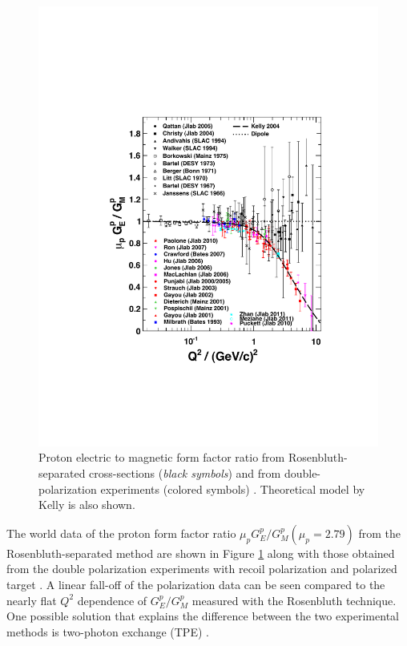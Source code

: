 \documentclass[12pt]{article}
\begin{document}
\begin{figure}[htbp]
\centering
\mbox{\includegraphics[scale=0.5]{gepgmp}}
\caption{Proton electric to magnetic form factor ratio from Rosenbluth-separated cross-sections (\emph{black symbols}) \cite{26, 27, 28, 29, 30, 31, 32, 33, 34, 35} and from double-polarization experiments (colored symbols) \cite{43, 44, 45, 46, 47, 48, 49, 50, 51, 52, 53, 54, 55, 56, 57, 58, 59, 60}. Theoretical model by Kelly \cite{99} is also shown.}
\label{fig1}
\end{figure}

The world data of the proton form factor ratio $\mu_pG^p_E/G^p_M (\mu_p=2.79)$ from the Rosenbluth-separated method \cite{26, 27, 28, 29, 30, 31, 32, 33, 34, 35}  are shown in Figure \ref{fig1} along with those obtained from the double polarization experiments with recoil polarization  \cite{43, 44, 45, 46, 47, 48, 49, 50, 51, 52, 53, 54, 55, 56, 57, 58} and polarized target \cite{59,60}. A linear fall-off of the polarization data can be seen compared to the nearly flat $Q^2$ dependence of $G_E^p/G_M^p$ measured with the Rosenbluth technique. One possible solution that explains the difference between the two experimental methods is two-photon exchange (TPE) \cite{89, 90, 91, 92, 93, 94, 95, 96, 97, 98}.
\end{document}
